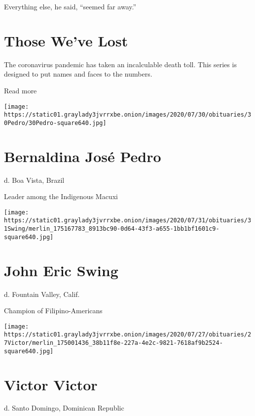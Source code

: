 Everything else, he said, ``seemed far away.''

\href{https://www.nytimes3xbfgragh.onion/interactive/2020/obituaries/people-died-coronavirus-obituaries.html?action=click\&pgtype=Article\&state=default\&region=BELOW_MAIN_CONTENT\&context=covid_obits_promo}{}

\hypertarget{those-weve-lost}{%
\section{Those We've Lost}\label{those-weve-lost}}

The coronavirus pandemic has taken an incalculable death toll. This
series is designed to put names and faces to the numbers.

Read more

\texttt{[image: https://static01.graylady3jvrrxbe.onion/images/2020/07/30/obituaries/30Pedro/30Pedro-square640.jpg]}

\hypertarget{bernaldina-josuxe9-pedro}{%
\section{Bernaldina José Pedro}\label{bernaldina-josuxe9-pedro}}

d. Boa Vista, Brazil

Leader among the Indigenous Macuxi

\texttt{[image: https://static01.graylady3jvrrxbe.onion/images/2020/07/31/obituaries/31Swing/merlin\_175167783\_8913bc90-0d64-43f3-a655-1bb1bf1601c9-square640.jpg]}

\hypertarget{john-eric-swing}{%
\section{John Eric Swing}\label{john-eric-swing}}

d. Fountain Valley, Calif.

Champion of Filipino-Americans

\texttt{[image: https://static01.graylady3jvrrxbe.onion/images/2020/07/27/obituaries/27Victor/merlin\_175001436\_38b11f8e-227a-4e2c-9821-7618af9b2524-square640.jpg]}

\hypertarget{victor-victor}{%
\section{Victor Victor}\label{victor-victor}}

d. Santo Domingo, Dominican Republic

